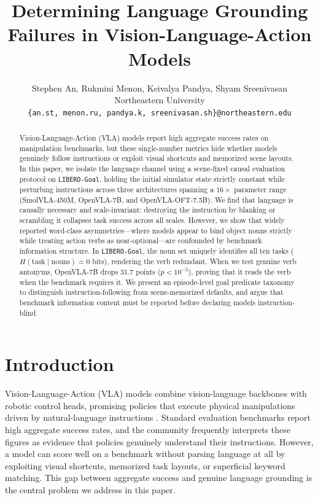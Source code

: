 \documentclass[11pt]{article}
\title{Determining Language Grounding Failures in Vision-Language-Action Models}
\author{Stephen An, Rukmini Menon, Keivalya Pandya, Shyam Sreenivasan \\
  Northeastern University\\\small{\texttt{\{an.st, menon.ru, pandya.k, sreenivasan.sh\}@northeastern.edu}}}
\begin{document}
\maketitle

\begin{abstract}
Vision-Language-Action (VLA) models report high aggregate success rates on manipulation benchmarks, but these single-number metrics hide whether models genuinely follow instructions or exploit visual shortcuts and memorized scene layouts. In this paper, we isolate the language channel using a scene-fixed causal evaluation protocol on \texttt{LIBERO-Goal}, holding the initial simulator state strictly constant while perturbing instructions across three architectures spanning a $16\times$ parameter range (SmolVLA-450M, OpenVLA-7B, and OpenVLA-OFT-7.5B). We find that language is causally necessary and scale-invariant: destroying the instruction by blanking or scrambling it collapses task success across all scales. However, we show that widely reported word-class asymmetries---where models appear to bind object nouns strictly while treating action verbs as near-optional---are confounded by benchmark information structure. In \texttt{LIBERO-Goal}, the noun set uniquely identifies all ten tasks ($H(\text{task}\mid\text{nouns})=0$ bits), rendering the verb redundant. When we test genuine verb antonyms, OpenVLA-7B drops 31.7 points ($p < 10^{-5}$), proving that it reads the verb when the benchmark requires it. We present an episode-level goal predicate taxonomy to distinguish instruction-following from scene-memorized defaults, and argue that benchmark information content must be reported before declaring models instruction-blind.
\end{abstract}


\section{Introduction}
Vision-Language-Action (VLA) models combine vision-language backbones with robotic control heads, promising policies that execute physical manipulations driven by natural-language instructions \citep{brohan2022rt1,brohan2023rt2,driess2023palm,kim2025openvla,shukor2025smolvla}. Standard evaluation benchmarks report high aggregate success rates, and the community frequently interprets these figures as evidence that policies genuinely understand their instructions. However, a model can score well on a benchmark without parsing language at all by exploiting visual shortcuts, memorized task layouts, or superficial keyword matching. This gap between aggregate success and genuine language grounding is the central problem we address in this paper.
\end{document}
